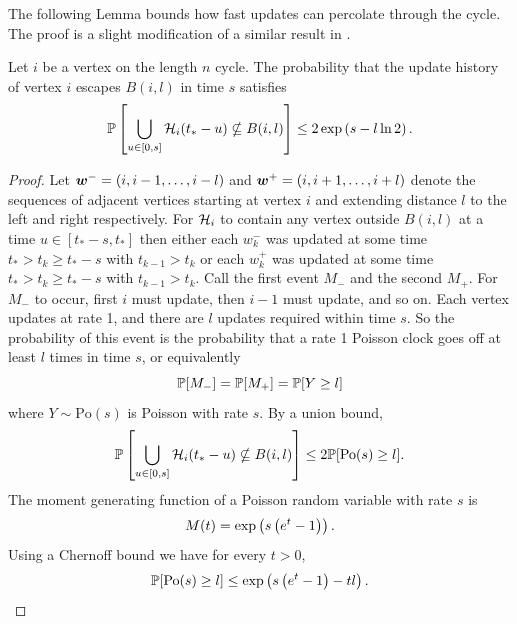 	The following Lemma bounds how fast updates can percolate through the cycle. The proof is a slight modification of a similar result in \cite[Lemma 2.1]{Lubetzky2016-wd}.
	\begin{lemma}
	\label{lem:1D prob history contained in ball}
		Let $i$ be a vertex on the length $n$ cycle. The probability that the update history of vertex $i$ escapes $B(i,l)$ in time $s$ satisfies
		\begin{equation}
			\mathbb{P}\left[\bigcup_{u \in [0, s]}\mathcal{H}_i(t_* - u) \nsubseteq B(i, l)\right] \leq 2\exp\left(s - l \ln 2 \right).
		\end{equation}
	\end{lemma}
	\begin{proof}
		Let ${\bm{{w}}}^- = (i, i-1, \dots, i- l)$ and ${\bm{{w}}}^+ = (i, i+1, \dots, i+ l)$ denote the sequences of adjacent vertices starting at vertex $i$ and extending distance $l$ to the left and right respectively. For $\mathcal{H}_i$ to contain any vertex outside $B(i, l)$ at a time $u \in [t_* - s, t_*]$ then either each $w_k^-$ was updated at some time $t_* > t_k \geq t_* - s$ with $t_{k-1} > t_k$ or each $w_k^+$ was updated at some time $t_* > t_k \geq t_* - s$ with $t_{k-1} > t_k$. Call the first event $M_-$ and the second $M_+$. For $M_-$ to occur, first $i$ must update, then $i-1$ must update, and so on. Each vertex updates at rate 1, and there are $l$ updates required within time $s$. So the probability of this event is the probability that a rate 1 Poisson clock goes off at least $l$ times in time $s$, or equivalently
		\begin{equation}
			\mathbb{P}[M_-] = \mathbb{P}[M_+] = \mathbb{P}[Y \geq  l ]
		\end{equation}
		where $Y \sim \mathrm{Po}(s)$ is Poisson with rate $s$. By a union bound,
		\begin{equation}
			\mathbb{P}\left[\bigcup_{u \in [0, s]}\mathcal{H}_i(t_* - u) \nsubseteq B(i, l)\right] \leq 2 \mathbb{P}[\mathrm{Po}(s) \geq  l].
		\end{equation}
		The moment generating function of a Poisson random variable with rate $s$ is
		\begin{equation}
			M(t) = \exp\left(s\left(e^t - 1\right)\right).
		\end{equation}
		Using a Chernoff bound we have for every $t > 0$,
		\begin{equation}
			\prob[\mathrm{Po}(s) \geq l] \leq \exp\left(s\left(\euler^t - 1\right) - t l\right).

\end{equation}
\end{proof}
